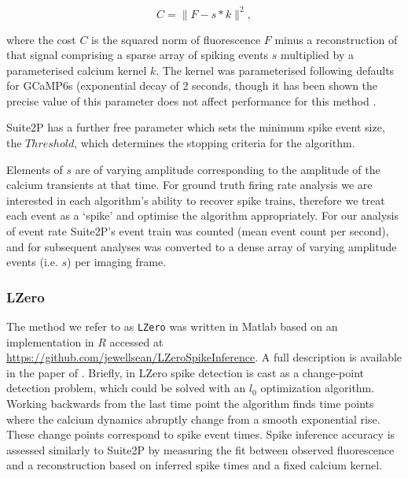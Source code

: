 \documentclass[a4paper,11pt]{article}
\begin{document}
\[C = \|F - s*k\|^2,\]

where the cost $C$ is the squared norm of fluorescence $F$ minus a reconstruction of that signal comprising a sparse array of spiking events $s$ multiplied by a parameterised calcium kernel $k$. The kernel was parameterised following defaults for GCaMP6s (exponential decay of 2 seconds, though it has been shown the precise value of this parameter does not affect performance for this method \citep{Pachitariu2018-cj}. 

Suite2P has a further free parameter which sets the minimum spike event size, the $Threshold$, which determines the stopping criteria for the algorithm.

Elements of $s$ are of varying amplitude corresponding to the amplitude of the calcium transients at that time.  For ground truth firing rate analysis we are interested in each algorithm's ability to recover spike trains, therefore we treat each event as a `spike' and optimise the algorithm appropriately. For our analysis of event rate Suite2P's event train was counted (mean event count per second), and for subsequent analyses was converted to a dense array of varying amplitude events (i.e. $s$) per imaging frame.

%



\subsubsection*{LZero}
The method we refer to as \texttt{LZero} was written in Matlab based on an implementation in $R$ accessed at \href{https://github.com/jewellsean/LZeroSpikeInference}{https://github.com/jewellsean/LZeroSpikeInference}. A full description is available in the paper of \citet{Jewell2018-cx}. Briefly, in LZero spike detection is cast as a change-point detection problem, which could be solved with an $l_{0}$ optimization algorithm. Working backwards from the last time point the algorithm finds time points where the calcium dynamics abruptly change from a smooth exponential rise. These change points correspond to spike event times. Spike inference accuracy is assessed similarly to Suite2P by measuring the fit between observed fluorescence and a reconstruction based on inferred spike times and a fixed calcium kernel. 
\end{document}
